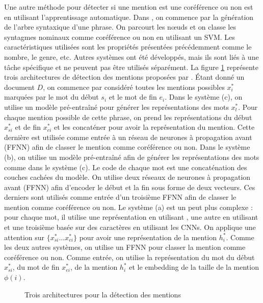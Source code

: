 \documentclass{KodeBook}
\begin{document}
Une autre méthode pour détecter si une mention est une coréférence ou non est en utilisant l'apprentissage automatique. 
Dans \cite{2013-uryupina-moschitti}, on commence par la génération de l'arbre syntaxique d'une phrase. 
On parcourt les nœuds et on classe les syntagmes nominaux comme coréférence ou non en utilisant un SVM. 
Les caractéristiques utilisées sont les propriétés présentées précédemment comme le nombre, le genre, etc.
Autres systèmes ont été développés, mais ils sont liés à une tâche spécifique et ne peuvent pas être utilisés séparément. 
La figure \ref{fig:det-mention-yu} représente trois architectures de détection des mentions proposées par \cite{2020-yu-al}. 
Étant donné un document $D$, on commence par considéré toutes les mentions possibles $x^*_i$ marquées par le mot du début $s_i$ et le mot de fin $e_i$. 
Dans le système (c), on utilise un modèle  pré-entraîné pour générer les représentations des mots $x^*_t$. 
Pour chaque mention possible de cette phrase, on prend les représentations du début $x^*_{si}$ et de fin $x^*_{ei}$ et les concaténer pour avoir la représentation du mention. 
Cette dernière est utilisée comme entrée à un réseau de neurones à propagation avant (FFNN) afin de classer le mention comme coréférence ou non. 
Dans le système (b), on utilise un modèle  pré-entraîné afin de générer les représentations des mots comme dans le système (c). 
Le code de chaque mot est une concaténation des couches cachées du modèle.
On utilise deux réseaux de neurones à propagation avant (FFNN) afin d'encoder le début et la fin sous forme de deux vecteurs. 
Ces derniers sont utilisés comme entrée d'un troisième FFNN afin de classer le mention comme coréférence ou non. 
Le système (a) est un peut plus complexe : pour chaque mot, il utilise une représentation en utilisant , une autre en utilisant  et une troisième basée sur des caractères en utilisant les CNNs. 
On applique une attention sur $\{x^*_{si}\ldots x^*_{ei}\}$ pour avoir une représentation de la mention $h^*_i$. 
Comme les deux autres systèmes, on utilise un FFNN pour classer la mention comme coréférence ou non. 
Comme entrée, on utilise la représentation du mot du début $x^*_{si}$, du mot de fin $x^*_{ei}$, de la mention $h^*_i$ et le embedding de la taille de la mention $\phi(i)$.
\begin{figure}[ht]
	\centering
	\caption[Trois architectures pour la détection des mentions]{Trois architectures pour la détection des mentions \cite{2020-yu-al}}
	\label{fig:det-mention-yu}
\end{figure}
\end{document}
